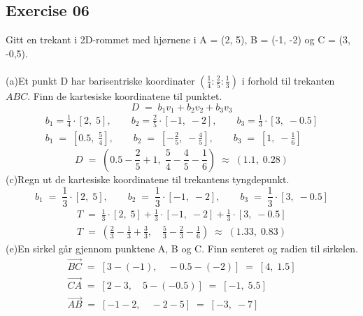 \documentclass[12pt, a4paper]{article}
\begin{document}
\subsection*{Exercise 06}
Gitt en trekant i 2D-rommet med hjørnene i A = (2, 5),
	B = (-1, -2) og C = (3, -0,5).\\\\
	(a)\quad Et punkt D har barisentriske koordinater $
	\left(\frac{1}{4}:\frac{2}{5}:\frac{1}{3}\right)
	$ i forhold til trekanten $ABC$. Finn de kartesiske 
	koordinatene til punktet.
		\begin{equation}
			\tag*{}
				D\;=\;b_1v_1+b_2v_2+b_3v_3
		\end{equation}
			\begin{gather}
				\tag*{}
					b_1=\frac{1}{4}\cdot[2,\;5],\qquad
					b_2=\frac{2}{5}\cdot[-1,\;-2],\qquad
					b_3=\frac{1}{3}\cdot[3,\;-0.5]\\
				\tag*{}
					b_1\;=\;\left[
						0.5,\;\frac{5}{4}
					\right],\qquad
					b_2\;=\;\left[
						-\frac{2}{5},\;-\frac{4}{5}
					\right],\qquad
					b_3\;=\;\left[
						1,\;-\frac{1}{6}
					\right]
			\end{gather}
			\begin{equation}
				\tag*{}
					D\;=\;\left(
						0.5-\frac{2}{5}+1,\;
						\frac{5}{4}-\frac{4}{5}-\frac{1}{6}
					\right)\;\approx\;\left(
						1.1,\;0.28
					\right)			
			\end{equation}
	(c)\quad Regn ut de kartesiske koordinatene til
	trekantens tyngdepunkt.
			\begin{equation}
				\tag*{}
					b_1\;=\;\frac{1}{3}\cdot[2,\;5],\qquad
					b_2\;=\;\frac{1}{3}\cdot[-1,\;-2],\qquad
					b_3\;=\;\frac{1}{3}\cdot[3,\;-0.5]
			\end{equation}
			\begin{gather*}
				T\;=\;
					\frac{1}{3}\cdot[2,\;5] +
					\frac{1}{3}\cdot[-1,\;-2] +
					\frac{1}{3}\cdot[3,\;-0.5]\\
				T\;=\;
					\left(
						\frac{2}{3}-\frac{1}{3}+\frac{3}{3}
					,\quad
						\frac{5}{3}-\frac{2}{3}-\frac{1}{6}
					\right)\;\approx\;
					\left(
						1.33,\;0.83
					\right)
			\end{gather*}
	(e)\quad En sirkel går gjennom punktene A, B og C.
	Finn senteret og radien til sirkelen.
			\begin{gather*}
				\vec{BC}\;=\;[3-(-1),\quad-0.5-(-2)]
					\;=\;[4,\;1.5]\\
				\vec{CA}\;=\;[2-3,\quad5-(-0.5)]
					\;=\;[-1,\;5.5]\\
				\vec{AB}\;=\;[-1-2,\quad-2-5]
					\;=\;[-3,\;-7]
			\end{gather*}
\end{document}
